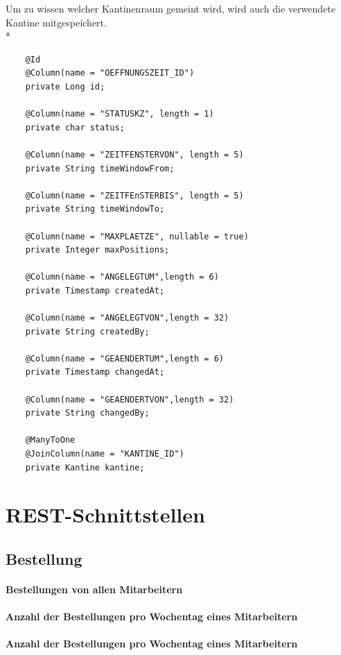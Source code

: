 Um zu wissen welcher Kantinenraum gemeint wird,  wird auch die verwendete Kantine mitgespeichert. \\*

\begin{lstlisting}
    @Id
    @Column(name = "OEFFNUNGSZEIT_ID")
    private Long id;

    @Column(name = "STATUSKZ", length = 1)
    private char status;

    @Column(name = "ZEITFENSTERVON", length = 5)
    private String timeWindowFrom;

    @Column(name = "ZEITFEnSTERBIS", length = 5)
    private String timeWindowTo;

    @Column(name = "MAXPLAETZE", nullable = true)
    private Integer maxPositions;

    @Column(name = "ANGELEGTUM",length = 6)
    private Timestamp createdAt;

    @Column(name = "ANGELEGTVON",length = 32)
    private String createdBy;

    @Column(name = "GEAENDERTUM",length = 6)
    private Timestamp changedAt;

    @Column(name = "GEAENDERTVON",length = 32)
    private String changedBy;

    @ManyToOne
    @JoinColumn(name = "KANTINE_ID")
    private Kantine kantine;
\end{lstlisting}

\section{REST-Schnittstellen}

\subsection{Bestellung}

\paragraph{Bestellungen von allen Mitarbeitern}

\paragraph{Anzahl der Bestellungen pro Wochentag eines Mitarbeitern}

\paragraph{Anzahl der Bestellungen pro Wochentag eines Mitarbeitern}

